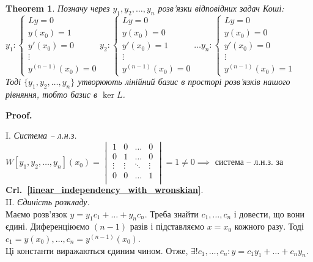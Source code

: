 \documentclass[a4paper, 10pt]{article}
\makeatletter
\def\qed{$\blacksquare$}
\theoremstyle{theoremdd}
\newtheorem{theorem}{Theorem}[subsection]
\theoremstyle{theoremdd}
\theoremstyle{theoremdd}
\theoremstyle{theoremdd}
\theoremstyle{theoremdd}
\theoremstyle{theoremdd}
\theoremstyle{theoremdd}
\theoremstyle{theoremdd}
\renewenvironment{proof}[1][Proof.\\]{\par
\pushQED{\hfill \qed}%
\normalfont \topsep6\p@\@plus6\p@\relax
\trivlist
\item\relax
{\bfseries
#1\@addpunct{.}}\hspace\labelsep\ignorespaces
}{%
\popQED\endtrivlist\@endpefalse
}
\newcommand\crlref[1]{\textbf{Crl.~\ref{#1}}}
\makeatother
\begin{document}
\begin{theorem}
Позначу через $y_1, y_2, \dots, y_n$ розв'язки відповідних задач Коші:\\
$y_1:
\begin{cases}
 Ly = 0\\
 y(x_0) = 1 \\
 y'(x_0) = 0 \\
 \vdots \\
 y^{(n-1)}(x_0) = 0
\end{cases}
y_2:
\begin{cases}
 Ly = 0\\
 y(x_0) = 0 \\
 y'(x_0) = 1 \\
 \vdots \\
 y^{(n-1)}(x_0) = 0
\end{cases}
\dots
y_n:
\begin{cases}
 Ly = 0\\
 y(x_0) = 0 \\
 y'(x_0) = 0 \\
 \vdots \\
 y^{(n-1)}(x_0) = 1
\end{cases}
$\\
Тоді $\{y_1, y_2, \dots, y_n\}$ утворюють лінійний базис в просторі розв'язків нашого рівняння, тобто базис в $\ker L$.
\end{theorem}

\begin{proof}
I. \textit{Система -- л.н.з.}\\
$\displaystyle W[y_1, y_2, \dots, y_n](x_0) = 
\begin{vmatrix} 
	1 &  0 & \dots & 0 \\ 
	0 &  1 & \dots & 0 \\
	\vdots &  \vdots & \ddots & \vdots \\
	0 &  0 & \dots & 1 \\
\end{vmatrix} = 1 \neq 0 \implies $ система -- л.н.з. за \crlref{linear_independency_with_wronskian}.
\bigskip \\
II. \textit{Єдиність розкладу.}\\
Маємо розв'язок $y = y_1c_1 + \dots + y_n c_n$. Треба знайти $c_1, \dots, c_n$ і довести, що вони єдині. Диференціюємо $(n-1)$ разів і підставляємо $x = x_0$ кожного разу. Тоді\\
$c_1 = y(x_0), \dots, c_n=y^{(n-1)}(x_0)$. \\
Ці константи виражаються єдиним чином. Отже, $\exists! c_1,\dots,c_n: y = c_1 y_1 + \dots + c_n y_n$.
\end{proof}
\end{document}

